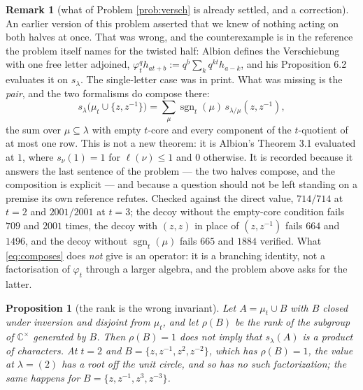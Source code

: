 \documentclass[11pt,reqno]{amsart}
\newcommand{\stverif}{\textcolor{hverif}{\small verified}}
\theoremstyle{plain}
\newtheorem{proposition}[theorem]{Proposition}
\theoremstyle{definition}
\newtheorem{remark}[theorem]{Remark}
\newcommand{\CC}{\mathbb{C}}
\newcommand{\zt}{\mu_t}
\begin{document}
\begin{remark}[what of Problem \ref{prob:versch} is already settled, and a correction]\label{rem:composes}
An earlier version of this problem asserted that we knew of nothing acting on both halves at once.
That was wrong, and the counterexample is in the reference the problem itself names for the twisted
half: Albion \cite[\S6.1]{Alb23} defines the Verschiebung with one free letter adjoined,
$\varphi^q_t h_{at+b}:=q^b\sum_k q^{kt}h_{a-k}$, and his Proposition 6.2 evaluates it on $s_\lambda$.
The single-letter case was in print. What was missing is the \emph{pair}, and the two formalisms do
compose there:
\begin{equation}\label{eq:composes}
s_\lambda\bigl(\mu_t\cup\{z,z^{-1}\}\bigr)=\sum_{\mu}\operatorname{sgn}_t(\mu)\,
s_{\lambda/\mu}(z,z^{-1}),
\end{equation}
the sum over $\mu\subseteq\lambda$ with empty $t$-core and every component of the $t$-quotient of at
most one row. This is not a new theorem: it is Albion's Theorem 3.1 evaluated at $1$, where
$s_\nu(1)=1$ for $\ell(\nu)\le1$ and $0$ otherwise. It is recorded because it answers the last
sentence of the problem --- the two halves compose, and the composition is explicit --- and because
a question should not be left standing on a premise its own reference refutes. Checked against the
direct value, $714/714$ at $t=2$ and $2001/2001$ at $t=3$; the decoy without the empty-core condition
fails $709$ and $2001$ times, the decoy with $(z,z)$ in place of $(z,z^{-1})$ fails $664$ and $1496$,
and the decoy without $\operatorname{sgn}_t(\mu)$ fails $665$ and $1884$ \stverif. What
\eqref{eq:composes} does \emph{not} give is an operator: it is a branching identity, not a
factorisation of $\varphi_t$ through a larger algebra, and the problem above asks for the latter.
\end{remark}

\begin{proposition}[the rank is the wrong invariant]\label{conj:rank}
Let $A=\zt\cup B$ with $B$ closed under inversion and disjoint from $\zt$, and let $\rho(B)$ be the
rank of the subgroup of $\CC^{\times}$ generated by $B$. Then $\rho(B)=1$ does not imply that
$s_\lambda(A)$ is a product of characters. At $t=2$ and $B=\{z,z^{-1},z^{2},z^{-2}\}$, which has
$\rho(B)=1$, the value at $\lambda=(2)$ has a root off the unit circle, and so has no such
factorization; the same happens for $B=\{z,z^{-1},z^{3},z^{-3}\}$.
\end{proposition}
\end{document}
